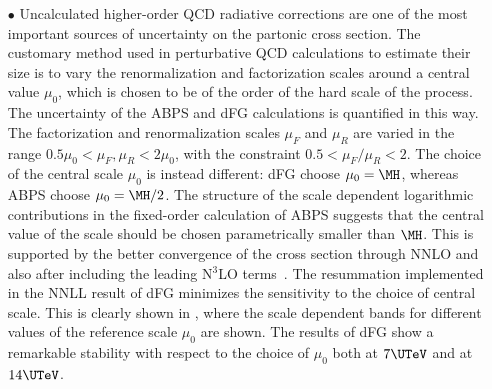 \begin{itemize}

\item[$\bullet$] Uncalculated higher-order QCD radiative corrections are one of the most important sources of uncertainty
on the partonic cross section. The customary method used in perturbative QCD calculations to 
estimate their size is to vary the renormalization and factorization scales around
a central value $\mu_0$, which is chosen to be of the order of the hard scale of the process.  The 
uncertainty of the ABPS and dFG calculations is quantified in this way.
The factorization and renormalization scales $\mu_F$ and $\mu_R$ are varied 
in the range $0.5 \mu_0< \mu_F,\mu_R< 2 \mu_0$, with the constraint
$0.5 < \mu_F/\mu_R < 2$. The choice of the central scale $\mu_0$ is instead different: dFG choose $\mu_0=\MH$, whereas ABPS 
choose $\mu_0=\MH/2$.  The structure of the scale dependent logarithmic contributions in the fixed-order calculation of ABPS suggests that the central value 
of the scale should be chosen parametrically smaller than $\MH$.  This is supported by the better convergence of the cross section 
through NNLO and also after including the leading N$^3$LO terms~\cite{Moch:2005ky}.  The resummation implemented in the NNLL result of dFG 
minimizes the sensitivity to the choice of central scale. 
This is clearly shown in , where the scale dependent bands for different values
of the reference scale $\mu_0$ are shown.
The results of dFG show a remarkable stability with respect to the choice of $\mu_0$ both at $7\UTeV$ and at $14\UTeV$.


\end{itemize}
